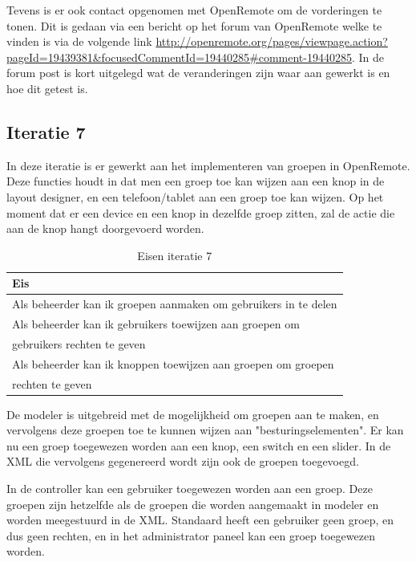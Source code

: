 \documentclass[]{article}
\begin{document}
Tevens is er ook contact opgenomen met OpenRemote om de vorderingen te tonen.
Dit is gedaan via een bericht op het forum van OpenRemote welke te vinden is via
de volgende link 
\url{http://openremote.org/pages/viewpage.action?pageId=19439381&focusedCommentId=19440285#comment-19440285}. 
In de forum post is kort uitgelegd wat de veranderingen zijn waar aan gewerkt is
en hoe dit getest is. 
 
\subsection{Iteratie 7}

In deze iteratie is er gewerkt aan het implementeren van groepen in OpenRemote.
Deze functies houdt in dat men een groep toe kan wijzen aan een knop in de layout
designer, en een telefoon/tablet aan een groep toe kan wijzen. Op het moment dat er
een device en een knop in dezelfde groep zitten, zal de actie die aan de knop
hangt doorgevoerd worden.

\begin{table}[htpb]
  \caption{Eisen iteratie 7}
  \begin{center}
    \begin{tabular}{|| l ||}\hline
        Eis                                                              \\\hline\hline
        Als beheerder kan ik groepen aanmaken om gebruikers in te delen  \\\hline
        Als beheerder kan ik gebruikers toewijzen aan groepen om         \\ 
        gebruikers rechten te geven                                      \\\hline
        Als beheerder kan ik knoppen toewijzen aan groepen om groepen    \\ 
        rechten te geven                                                 \\\hline
    \end{tabular}
  \end{center}
\end{table}

De modeler is uitgebreid met de mogelijkheid om groepen aan te maken, en
vervolgens deze groepen toe te kunnen wijzen aan "besturingselementen". Er kan
nu een groep toegewezen worden aan een knop, een switch en een slider. In de XML
die vervolgens gegenereerd wordt zijn ook de groepen toegevoegd. 

In de controller kan een gebruiker toegewezen worden aan een groep. Deze groepen
zijn hetzelfde als de groepen die worden aangemaakt in modeler en worden
meegestuurd in de XML. Standaard heeft een gebruiker geen groep, en dus geen
rechten, en in het administrator paneel kan een groep toegewezen worden.
\end{document}
